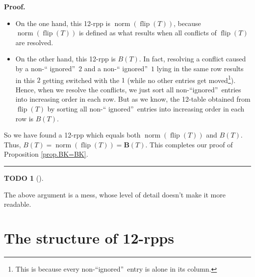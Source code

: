 \documentclass[numbers=enddot,12pt,final,onecolumn,notitlepage]{scrartcl}%
\theoremstyle{definition}
\newtheorem{quest}[theo]{TODO}
\newenvironment{todo}[1][]
{\begin{quest}[#1]\begin{leftbar}}
{\end{leftbar}\end{quest}}
\newenvironment{proof}[1][Proof]{\noindent\textbf{#1.} }{\ \rule{0.5em}{0.5em}}
\begin{document}
\begin{proof}
\begin{itemize}
\item On the one hand, this 12-rpp is $\operatorname*{norm}\left(
\operatorname*{flip}\left(  T\right)  \right)  $, because
$\operatorname*{norm}\left(  \operatorname*{flip}\left(  T\right)  \right)  $
is defined as what results when all conflicts of $\operatorname*{flip}\left(
T\right)  $ are resolved.

\item On the other hand, this 12-rpp is $B\left(  T\right)  $. In fact,
resolving a conflict caused by a non-\textquotedblleft
ignored\textquotedblright\ $2$ and a non-\textquotedblleft
ignored\textquotedblright\ $1$ lying in the same row results in this $2$
getting switched with the $1$ (while no other entries get moved\footnote{This
is because every non-\textquotedblleft ignored\textquotedblright\ entry is
alone in its column.}). Hence, when we resolve the conflicts, we just sort all
non-\textquotedblleft ignored\textquotedblright\ entries into increasing order
in each row. But as we know, the 12-table obtained from $\operatorname*{flip}%
\left(  T\right)  $ by sorting all non-\textquotedblleft
ignored\textquotedblright\ entries into increasing order in each row is
$B\left(  T\right)  $.
\end{itemize}

So we have found a 12-rpp which equals both $\operatorname*{norm}\left(
\operatorname*{flip}\left(  T\right)  \right)  $ and $B\left(  T\right)  $.
Thus, $B\left(  T\right)  =\operatorname*{norm}\left(  \operatorname*{flip}%
\left(  T\right)  \right)  =\mathbf{B}\left(  T\right)  $. This completes our
proof of Proposition \ref{prop.BK=BK}.
\end{proof}

\begin{todo}
The above argument is a mess, whose level of detail doesn't make it more
readable.
\end{todo}



\section{The structure of 12-rpps}
\label{sect.structure}
\def\seplist{{\operatorname*{seplist}}} %
\def\ceq{{\operatorname*{ceq}}}
\def\ircont{{\operatorname*{ircont}}}
\def\ceqvar{{{\alpha}}} %
\def\seplistvar{{{\nu}}} %
\def\supp{{\operatorname*{supp}}}
\def\NS{{\operatorname*{NR}}}
\def\g{{\widetilde{g}}}
\def\t{{\mathbf{t}}}
\def\lm{{\lambda/\mu}}
\def\lmp{{(\lambda/\mu)}}
\def\N{{\mathbb{N}}}
\def\Z{\mathbb{Z}}
\def\xx{{\mathbf{x}}}
\end{document}
